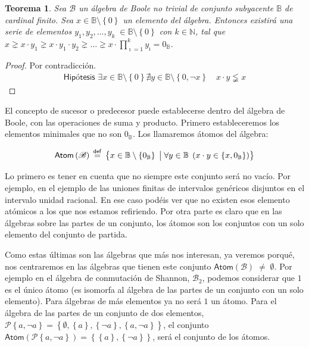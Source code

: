 \documentclass[final,12pt,a4paper,twoside,fleqn]{extbook}
\newcommand{\mathdef}{\ensuremath{\stackrel{\mathsf{def}}{{}={}}}}
\newcommand{\set}[1]{\ensuremath{\left\lbrace{#1}\right\rbrace}}
\newcommand {\setCompr}[2]{
	\ensuremath{
		\left\lbrace{ 
			#1 {\;\big{\vert}\;} #2
        }\right\rbrace
    }
}
\newcommand{\setN}{\ensuremath{\mathds{N}}}
\newcommand{\setB}{\ensuremath{\mathbb{B}}}
\newcommand{\algB}{\ensuremath{\mathscr{B}}}
\newtheorem{thm}{Teorema}[chapter]
\theoremstyle{definition}
\theoremstyle{remark}
\begin{document}
\begin{thm}
Sea \(\algB\) un álgebra de Boole no trivial de conjunto subyacente \(\setB\)
de cardinal finito. Sea \(x \in \setB\setminus\set{0} \) un elemento del
álgebra. Entonces existirá una serie de elementos \(y_1, y_2, \ldots ,
y_k\;\in\setB\setminus\set{0}\) con \(k \in \setN\), tal que \( x \gneq x
\cdot y_1 \gneq x \cdot y_1 \cdot y_2 \gneq \ldots \gneq x \cdot
{\prod}_{\imath=1}^{k} y_{\imath} = 0_{\setB}\).
\end{thm}



\begin{proof}
Por contradicción.
\begin{eqnarray}
\textsf{Hipótesis  } \exists x \in \setB\setminus\set{0} \nexists y \in \setB\setminus\set{0,\neg x}\quad x \cdot y \lneqq x
\end{eqnarray}
\end{proof}


	El concepto de sucesor o predecesor puede establecerse dentro del álgebra
de Boole, con las operaciones de suma y producto. Primero estableceremos los
elementos minimales que no son \(0_\setB\). Los llamaremos átomos del
álgebra:



\begin{equation}
\mathsf{Atom} \left( \algB \right) \mathdef \setCompr{x \in \setB \setminus
\set{0_\setB}}{ \forall y \in \setB \; \left( x \cdot y \in \set{x,0_\setB}
\right) }
\end{equation}



	Lo primero es tener en cuenta que no siempre este conjunto será no vacío.
Por ejemplo, en el ejemplo de las uniones finitas de intervalos genéricos
disjuntos en el intervalo unidad racional. En ese caso podéis ver que no
existen esos elemento atómicos a los que nos estamos refiriendo. Por otra
parte es claro que en las álgebras sobre las partes de un conjunto, los
átomos son los conjuntos con un solo elemento del conjunto de partida.



	Como estas últimas son las álgebras que más nos interesan, ya veremos
porqué, nos centraremos en las álgebras que tienen este conjunto
\(\mathsf{Atom}\left(\algB\right) \;\neq\; \emptyset\). Por ejemplo en el
álgebra de conmutación de Shannon, \(\algB_2\), podemos considerar que \(1\)
es el único átomo (es isomorfa al álgebra de las partes de un conjunto con un
solo elemento). Para álgebras de más elementos ya no será \(1\) un átomo.
Para el álgebra de las partes de un conjunto de dos elementos, \(\mathscr{P}
\set{a,\neg a} = \set{\emptyset, \set{a}, \set{\neg a}, \set{a,\neg a}}\), el
conjunto \(\mathsf{Atom}\left(\mathscr{P} \set{a,\neg
a}\right)=\set{\set{a},\set{\neg a}}\), será el conjunto de los átomos.
\end{document}

